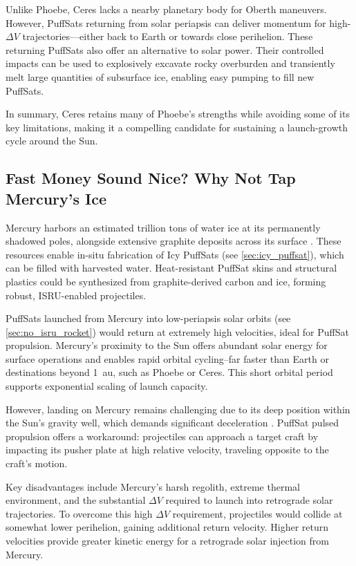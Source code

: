 \documentclass{article}
\begin{document}
Unlike Phoebe, Ceres lacks a nearby planetary body for Oberth maneuvers. However, PuffSats returning from solar periapsis can deliver momentum for high-$\Delta V$ trajectories—either back to Earth or towards close perihelion. These returning PuffSats also offer an alternative to solar power. Their controlled impacts can be used to explosively excavate rocky overburden and transiently melt large quantities of subsurface ice, enabling easy pumping to fill new PuffSats.

In summary, Ceres retains many of Phoebe’s strengths while avoiding some of its key limitations, making it a compelling candidate for sustaining a launch-growth cycle around the Sun.

\subsection{Fast Money Sound Nice?  Why Not Tap Mercury's Ice}
Mercury harbors an estimated trillion tons of water ice at its permanently shadowed poles, alongside extensive graphite deposits across its surface \cite{wikipediaMercuryPlanet}. These resources enable in-situ fabrication of Icy PuffSats (see \autoref{sec:icy_puffsat}), which can be filled with harvested water. Heat-resistant PuffSat skins and structural plastics could be synthesized from graphite-derived carbon and ice, forming robust, ISRU-enabled projectiles.

PuffSats launched from Mercury into low-periapsis solar orbits (see \autoref{sec:no_isru_rocket}) would return at extremely high velocities, ideal for PuffSat propulsion. Mercury’s proximity to the Sun offers abundant solar energy for surface operations and enables rapid orbital cycling--far faster than Earth or destinations beyond \SI{1}{\astronomicalunit}, such as Phoebe or Ceres. This short orbital period supports exponential scaling of launch capacity.

However, landing on Mercury remains challenging due to its deep position within the Sun’s gravity well, which demands significant deceleration \cite{lewis2025bepicolombo}. PuffSat pulsed propulsion offers a workaround: projectiles can approach a target craft by impacting its pusher plate at high relative velocity, traveling opposite to the craft’s motion.

Key disadvantages include Mercury’s harsh regolith, extreme thermal environment, and the substantial $\Delta V$ required to launch into retrograde solar trajectories. To overcome this high $\Delta V$ requirement, projectiles would collide at somewhat lower perihelion, gaining additional return velocity.  Higher return velocities provide greater kinetic energy for a retrograde solar injection from Mercury.
\end{document}
